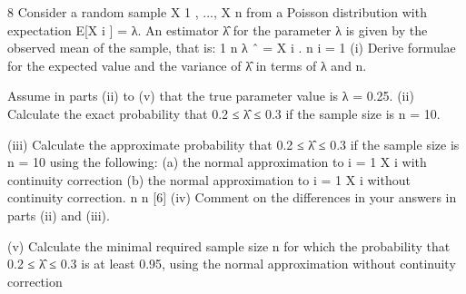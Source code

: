 \documentclass[a4paper,12pt]{article}
\begin{document}
\begin{enumerate}
8
Consider a random sample X 1 , ..., X n from a Poisson distribution with expectation E[X i ] = λ. An estimator λ̂ for the parameter λ is given by the observed mean of the sample, that is:
1 n
λ ˆ = \sum X i .
n i = 1
(i)
Derive formulae for the expected value and the variance of λ̂ in terms of λ and n.

Assume in parts (ii) to (v) that the true parameter value is λ = 0.25.
(ii) Calculate the exact probability that 0.2 ≤ λ̂ ≤ 0.3 if the sample size is n = 10.

(iii) Calculate the approximate probability that 0.2 ≤ λ̂ ≤ 0.3 if the sample size is
n = 10 using the following:
(a) the normal approximation to \sum i = 1 X i with continuity correction
(b) the normal approximation to \sum i = 1 X i without continuity correction.
n
n
[6]
(iv) Comment on the differences in your answers in parts (ii) and (iii).

(v) Calculate the minimal required sample size n for which the probability that 0.2 ≤ λ̂ ≤ 0.3 is at least 0.95, using the normal approximation without continuity correction


\end{enumerate}
\end{document}
